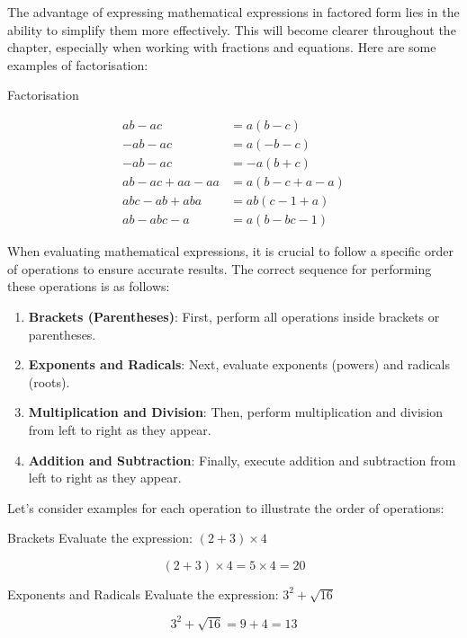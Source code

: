 The advantage of expressing mathematical expressions in factored form lies in the ability to simplify them more effectively. This will become clearer throughout the chapter, especially when working with fractions and equations. Here are some examples of factorisation:

\newpage

\begin{example} Factorisation

\begin{align*}
ab - ac &= a(b - c) \\
-ab - ac &= a(-b - c) \\
-ab - ac &= -a(b + c) \\
ab - ac + aa - aa &= a(b - c + a - a) \\
abc - ab + aba &= ab(c - 1 + a) \\
ab - abc - a &= a(b - bc - 1)
\end{align*}

\end{example}

When evaluating mathematical expressions, it is crucial to follow a specific order of operations to ensure accurate results. The correct sequence for performing these operations is as follows:

\begin{enumerate}
    \item \textbf{Brackets (Parentheses)}: First, perform all operations inside brackets or parentheses.
    \item \textbf{Exponents and Radicals}: Next, evaluate exponents (powers) and radicals (roots).
    \item \textbf{Multiplication and Division}: Then, perform multiplication and division from left to right as they appear.
    \item \textbf{Addition and Subtraction}: Finally, execute addition and subtraction from left to right as they appear.
\end{enumerate}

Let's consider examples for each operation to illustrate the order of operations:

\begin{example} Brackets \newline
Evaluate the expression: \((2 + 3) \times 4\)

\[
(2 + 3) \times 4 = 5 \times 4 = 20
\]
\end{example}

\begin{example} Exponents and Radicals \newline
Evaluate the expression: \(3^2 + \sqrt{16}\)

\[
3^2 + \sqrt{16} = 9 + 4 = 13
\]
\end{example}

